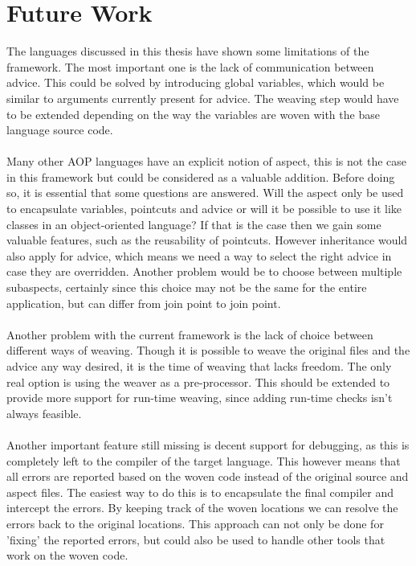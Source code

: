 \documentclass[a4paper]{report}
\begin{document}
\chapter{Future Work}
\label{chap:FutureWork}
The languages discussed in this thesis have shown some limitations of the framework. The most important one is the lack of communication between advice. This could be solved by introducing global variables, which would be similar to arguments currently present for advice. The weaving step would have to be extended depending on the way the variables are woven with the base language source code.\\
\\
Many other AOP languages have an explicit notion of aspect, this is not the case in this framework but could be considered as a valuable addition. Before doing so, it is essential that some questions are answered. Will the aspect only be used to encapsulate variables, pointcuts and advice or will it be possible to use it like classes in an object-oriented language? If that is the case then we gain some valuable features, such as the reusability of pointcuts. However inheritance would also apply for advice, which means we need a way to select the right advice in case they are overridden. Another problem would be to choose between multiple subaspects, certainly since this choice may not be the same for the entire application, but can differ from join point to join point.\\
\\
Another problem with the current framework is the lack of choice between different ways of weaving. Though it is possible to weave the original files and the advice any way desired, it is the time of weaving that lacks freedom. The only real option is using the weaver as a pre-processor. This should be extended to provide more support for run-time weaving, since adding run-time checks isn't always feasible.\\
\\
Another important feature still missing is decent support for debugging, as this is completely left to the compiler of the target language. This however means that all errors are reported based on the woven code instead of the original source and aspect files. The easiest way to do this is to encapsulate the final compiler and intercept the errors. By keeping track of the woven locations we can resolve the errors back to the original locations. This approach can not only be done for 'fixing' the reported errors, but could also be used to handle other tools that work on the woven code.\\
\end{document}
